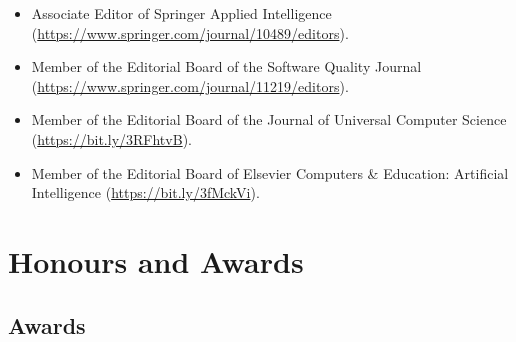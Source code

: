 \documentclass[a4paper,9pt]{article} %
\begin{document}
\begin{itemize}
	\item Associate Editor of Springer Applied Intelligence (\url{https://www.springer.com/journal/10489/editors}). 
	\item Member of the Editorial Board of the Software Quality Journal (\url{https://www.springer.com/journal/11219/editors}).
	\item Member of the Editorial Board of the Journal of Universal Computer Science (\url{https://bit.ly/3RFhtvB}).
	\item Member of the Editorial Board of Elsevier	Computers \& Education: Artificial Intelligence (\url{https://bit.ly/3fMckVi}).
\end{itemize}



\section{Honours and Awards}

\subsection*{Awards}
\end{document}
